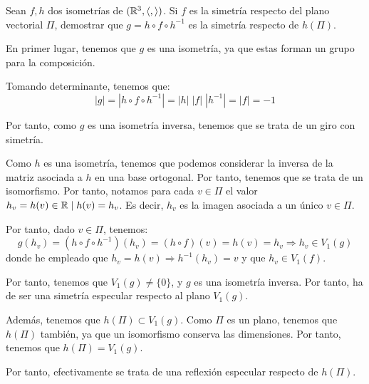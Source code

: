 \begin{ejercicio}
    Sean $f, h$ dos isometrías de $(\mathbb{R}^3, \langle,\rangle)$. Si $f$ es la simetría respecto del plano vectorial $\Pi$, demostrar que $g=h\circ f \circ h^{-1}$ es la simetría respecto de $h(\Pi)$.

    En primer lugar, tenemos que $g$ es una isometría, ya que estas forman un grupo para la composición.

    Tomando determinante, tenemos que:
    \begin{equation*}
        |g| = |h\circ f\circ h^{-1}| = |h|\;|f|\;|h^{-1}| = |f| = -1
    \end{equation*}

    Por tanto, como $g$ es una isometría inversa, tenemos que se trata de un giro con simetría.

    Como $h$ es una isometría, tenemos que podemos considerar la inversa de la matriz asociada a $h$ en una base ortogonal. Por tanto, tenemos que se trata de un isomorfismo. Por tanto,
    notamos para cada $v\in \Pi$ el valor $h_v = h(v) \in \mathbb{R}\mid h(v)=h_v$. Es decir, $h_v$ es la imagen asociada a un único $v\in \Pi$.

    Por tanto, dado $v\in \Pi$, tenemos:
    \begin{equation*}
        g(h_v) = (h\circ f\circ h^{-1})(h_v) = (h\circ f)(v) = h(v) = h_v \Longrightarrow h_v\in V_1(g)
    \end{equation*}
    donde he empleado que $h_v = h(v)\Longrightarrow h^{-1}(h_v) = v$ y que $h_v\in V_1(f)$. 

    Por tanto, tenemos que $V_1(g)\neq \{0\}$, y $g$ es una isometría inversa. Por tanto, ha de ser una simetría especular respecto al plano $V_1(g)$.

    Además, tenemos que $h(\Pi)\subset V_1(g)$. Como $\Pi$ es un plano, tenemos que $h(\Pi)$ también, ya que un isomorfismo conserva las dimensiones. Por tanto, tenemos que $h(\Pi) = V_1(g)$.

    Por tanto, efectivamente se trata de una reflexión especular respecto de $h(\Pi)$.
\end{ejercicio}


